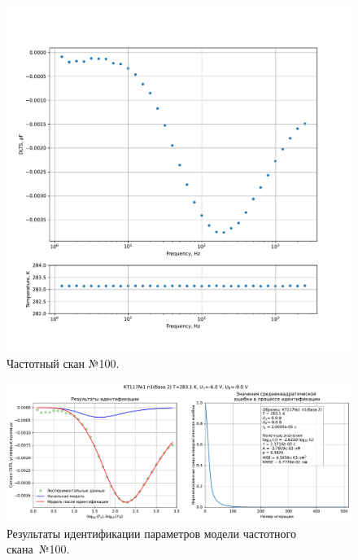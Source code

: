 \begin{figure}[!ht]
    \centering
    \includegraphics[width=1\textwidth]{../plots/КТ117№1_п1(база 2)_2500Гц-1Гц_1пФ_+10С_-6В-9В_100мВ_20мкс_шаг_0,1.pdf}
    \caption{Частотный скан №100.}
    \label{pic:frequency_scan_100}
\end{figure}

\begin{figure}[!ht]
    \centering
    \includegraphics[width=1\textwidth]{../plots/КТ117№1_п1(база 2)_2500Гц-1Гц_1пФ_+10С_-6В-9В_100мВ_20мкс_шаг_0,1_model.pdf}
    \caption{Результаты идентификации параметров модели частотного скана~№100.}
    \label{pic:frequency_scan_model100}
\end{figure}

\pagebreak


